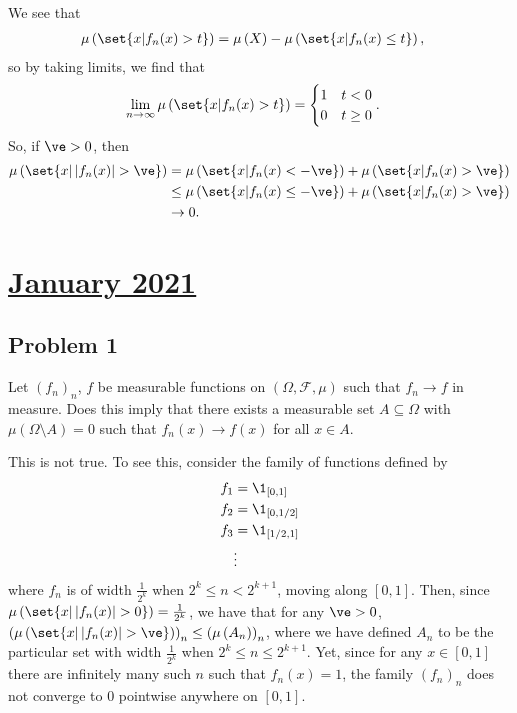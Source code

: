\documentclass[10pt]{mypackage}
\begin{document}
We see that
\begin{align*}
  \mu\left( \set{x | f_n(x) > t} \right) &= \mu\left( X \right) - \mu\left( \set{x | f_n(x) \leq t} \right),
\end{align*}
so by taking limits, we find that
\begin{align*}
  \lim_{n\rightarrow\infty} \mu\left( \set{x | f_n(x) > t} \right) &= \begin{cases}
    1 & t < 0\\
    0 & t\geq 0
  \end{cases}.
\end{align*}
So, if $\ve > 0$, then
\begin{align*}
  \mu\left( \set{x | \left\vert f_n(x) \right\vert > \ve} \right) &= \mu\left( \set{x | f_n(x) < -\ve} \right) + \mu\left( \set{x | f_n(x) > \ve} \right)\\
                                                                  &\leq \mu\left( \set{x | f_n(x)\leq -\ve} \right) + \mu\left( \set{x | f_n(x) > \ve} \right)\\
                                                                  &\rightarrow 0.
\end{align*}
\section{\href{https://math.virginia.edu/graduate/exams/analysis/2021Jan_real.pdf}{January 2021}}%
\subsection{Problem 1}%
\begin{problem}
  Let $\left( f_n \right)_n$, $f$ be measurable functions on $\left( \Omega,\mathcal{F},\mu \right)$ such that $f_n\rightarrow f$ in measure. Does this imply that there exists a measurable set $A\subseteq \Omega$ with $\mu\left( \Omega\setminus A \right) = 0$ such that $f_n(x)\rightarrow f(x)$ for all $x\in A$.
\end{problem}

This is not true. To see this, consider the family of functions defined by
\begin{align*}
  f_1 &= \1_{[0,1]}\\
  f_2 &= \1_{[0,1/2]}\\
  f_3 &= \1_{[1/2,1]}\\
      &\vdots
\end{align*}
where $f_n$ is of width $\frac{1}{2^{k}}$ when $2^{k} \leq n < 2^{k+1}$, moving along $[0,1]$. Then, since $\mu\left( \set{x | \left\vert f_n(x) \right\vert > 0} \right) = \frac{1}{2^{k}}$, we have that for any $\ve > 0$, $\left( \mu\left( \set{x | \left\vert f_n(x) \right\vert > \ve} \right) \right)_n \leq \left( \mu\left( A_n \right) \right)_n$, where we have defined $A_n$ to be the particular set with width $\frac{1}{2^{k}}$ when $2^{k}\leq n\leq 2^{k+1}$. Yet, since for any $x\in [0,1]$ there are infinitely many such $n$ such that $f_n(x) = 1$, the family $\left( f_n \right)_n$ does not converge to $0$ pointwise anywhere on $[0,1]$.
\end{document}
